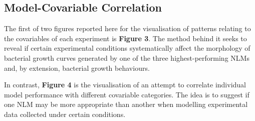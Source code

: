 \documentclass[11pt]{article}
\begin{document}




\subsection{Model-Covariable Correlation}

The first of two figures reported here for the visualisation of patterns relating to the covariables of each experiment is \textbf{Figure 3}. The method behind it seeks to reveal if certain experimental conditions systematically affect the morphology of bacterial growth curves generated by one of the three highest-performing NLMs and, by extension, bacterial growth behaviours.

In contrast, \textbf{Figure 4} is the visualisation of an attempt to correlate individual model performance with different covariable categories. The idea is to suggest if one NLM may be more appropriate than another when modelling experimental data collected under certain conditions.
\end{document}
